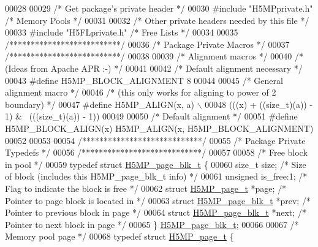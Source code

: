 \begin{DoxyCode}
00028 
00029 \textcolor{comment}{/* Get package's private header */}
00030 \textcolor{preprocessor}{#include "H5MPprivate.h"}    \textcolor{comment}{/* Memory Pools             */}
00031 
00032 \textcolor{comment}{/* Other private headers needed by this file */}
00033 \textcolor{preprocessor}{#include "H5FLprivate.h"}    \textcolor{comment}{/* Free Lists                           */}
00034 
00035 \textcolor{comment}{/**************************/}
00036 \textcolor{comment}{/* Package Private Macros */}
00037 \textcolor{comment}{/**************************/}
00038 
00039 \textcolor{comment}{/* Alignment macros */}
00040 \textcolor{comment}{/* (Ideas from Apache APR :-) */}
00041 
00042 \textcolor{comment}{/* Default alignment necessary */}
00043 \textcolor{preprocessor}{#define H5MP\_BLOCK\_ALIGNMENT    8}
00044 
00045 \textcolor{comment}{/* General alignment macro */}
00046 \textcolor{comment}{/* (this only works for aligning to power of 2 boundary) */}
00047 \textcolor{preprocessor}{#define H5MP\_ALIGN(x, a) \(\backslash\)}
00048 \textcolor{preprocessor}{       (((x) + ((size\_t)(a)) - 1) & ~(((size\_t)(a)) - 1))}
00049 
00050 \textcolor{comment}{/* Default alignment */}
00051 \textcolor{preprocessor}{#define H5MP\_BLOCK\_ALIGN(x) H5MP\_ALIGN(x, H5MP\_BLOCK\_ALIGNMENT)}
00052 
00053 
00054 \textcolor{comment}{/****************************/}
00055 \textcolor{comment}{/* Package Private Typedefs */}
00056 \textcolor{comment}{/****************************/}
00057 
00058 \textcolor{comment}{/* Free block in pool */}
00059 \textcolor{keyword}{typedef} \textcolor{keyword}{struct }\hyperlink{struct_h5_m_p__page__blk__t}{H5MP\_page\_blk\_t} \{
00060     \textcolor{keywordtype}{size\_t} size;                        \textcolor{comment}{/* Size of block (includes this H5MP\_page\_blk\_t info) */}
00061     \textcolor{keywordtype}{unsigned} is\_free:1;                 \textcolor{comment}{/* Flag to indicate the block is free */}
00062     \textcolor{keyword}{struct }\hyperlink{struct_h5_m_p__page__t}{H5MP\_page\_t} *page;           \textcolor{comment}{/* Pointer to page block is located in */}
00063     \textcolor{keyword}{struct }\hyperlink{struct_h5_m_p__page__blk__t}{H5MP\_page\_blk\_t} *prev;       \textcolor{comment}{/* Pointer to previous block in page */}
00064     \textcolor{keyword}{struct }\hyperlink{struct_h5_m_p__page__blk__t}{H5MP\_page\_blk\_t} *next;       \textcolor{comment}{/* Pointer to next block in page */}
00065 \} \hyperlink{struct_h5_m_p__page__blk__t}{H5MP\_page\_blk\_t};
00066 
00067 \textcolor{comment}{/* Memory pool page */}
00068 \textcolor{keyword}{typedef} \textcolor{keyword}{struct }\hyperlink{struct_h5_m_p__page__t}{H5MP\_page\_t} \{

\end{DoxyCode}
